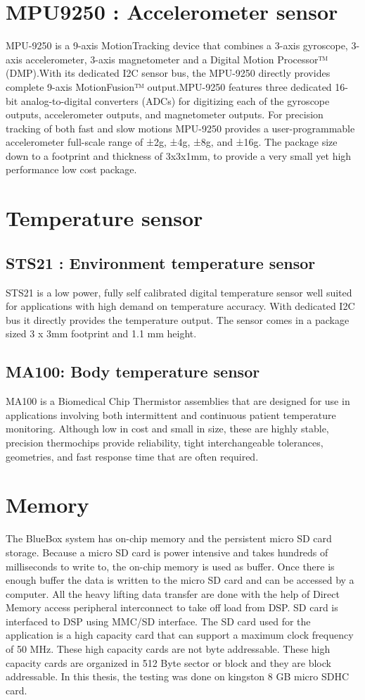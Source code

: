 \section{MPU9250 : Accelerometer sensor}
MPU-9250 is a 9-axis MotionTracking device that combines a 3-axis gyroscope, 3-axis accelerometer, 3-axis magnetometer and a Digital Motion Processor™ (DMP).With its dedicated I2C sensor bus, the MPU-9250 directly provides complete 9-axis MotionFusion™ output.MPU-9250 features three dedicated 16-bit analog-to-digital converters (ADCs) for digitizing each of the gyroscope outputs, accelerometer outputs, and magnetometer outputs. For precision tracking of both fast and slow motions MPU-9250 provides a user-programmable accelerometer full-scale range of ±2g, ±4g, ±8g, and ±16g. The package size down to a footprint and thickness of 3x3x1mm, to provide a very small yet high performance low cost package. 
\section{Temperature sensor}
\subsection{ STS21 : Environment temperature sensor}
STS21 is a low power, fully self calibrated digital temperature sensor well suited for applications with high demand on temperature accuracy. With dedicated I2C bus it directly provides the temperature output. The sensor comes in a package sized 3 x 3mm footprint and 1.1 mm height. 

\subsection{MA100: Body temperature sensor} 
MA100 is a Biomedical Chip Thermistor assemblies that are designed for use in applications involving both intermittent and continuous patient temperature monitoring. Although low in cost and small in size, these are highly stable, precision thermochips provide reliability, tight interchangeable tolerances, geometries, and fast response time that are often required. 
\section{Memory}
The BlueBox system has on-chip memory and the persistent micro SD card storage. Because a micro SD card is power intensive and takes hundreds of milliseconds to write to, the on-chip memory is used as buffer. Once there is enough buffer the data is written to the micro SD card and can be accessed by a computer. All the heavy lifting data transfer are done with the help of Direct Memory access peripheral interconnect to take off load from DSP. SD card is interfaced to DSP using MMC/SD interface. The SD card used for the application is a high capacity card that can support a maximum clock frequency of 50 MHz. These high capacity cards are not byte addressable. These high capacity cards are organized in 512 Byte sector or block and they are block addressable. In this thesis, the testing was done on kingston 8 GB micro SDHC card. 

